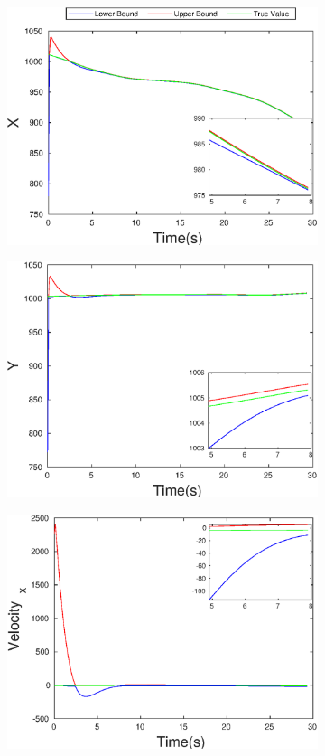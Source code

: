 \begin{figure}[h]
\begin{subfigure}{.5\linewidth}
\centering
\includegraphics[width=\linewidth]{figures/Prad/s3pmpradX}
\end{subfigure}
\begin{subfigure}{.5\linewidth}
\centering
\includegraphics[width=\linewidth]{figures/Prad/s3pmpradY}
\end{subfigure}
\begin{subfigure}{.5\linewidth}
\centering
\includegraphics[width=.9\linewidth]{figures/Prad/s3pmpradVelocity_x}

\end{subfigure}
\end{figure}
